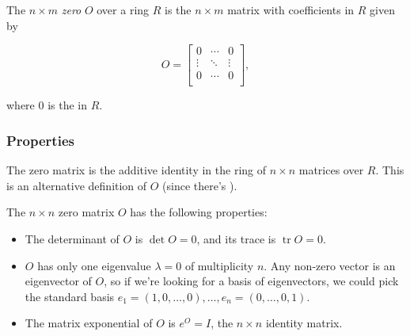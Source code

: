 \documentclass[12pt]{article}
\begin{document}

The $n \times m$ \emph{zero } $O$ over a ring $R$ is the $n \times m$ matrix with 
coefficients in $R$ given by
 
 $$ O = 
 \begin{bmatrix}
 0 & \cdots & 0 \\
 \vdots &  \ddots & \vdots \\
 0 & \cdots &  0 \\
 \end{bmatrix},$$

where  0 is the  in $R$.
 
\subsubsection{Properties}
The zero matrix is the additive identity in the ring of $n\times n$ matrices over $R$. This  is an alternative definition of $O$ (since there's ). 
 
The $n\times n$ zero matrix $O$ has the following properties:
 \begin{itemize}
 \item The determinant of $O$ is $\det O = 0$, and its trace is
 $\operatorname{tr}O = 0$.
 \item $O$ has only one eigenvalue $\lambda =0$ of
 multiplicity $n$. Any non-zero vector is an eigenvector of $O$, so if we're looking for a basis of eigenvectors, we could pick the standard basis $e_1=(1,0,\ldots, 0), \ldots , e_n=(0,\ldots, 0,1)$.
 \item The matrix exponential of $O$ is $e^O = I$, the $n\times n$ identity matrix.
 \end{itemize}
\end{document}
